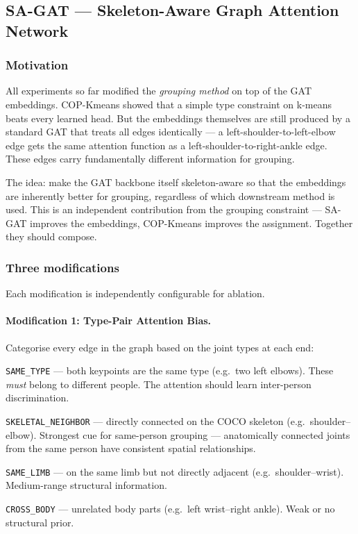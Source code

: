 \subsection{SA-GAT --- Skeleton-Aware Graph Attention Network}

\subsubsection{Motivation}

All experiments so far modified the \emph{grouping method} on top of the GAT embeddings. COP-Kmeans showed that a simple type constraint on k-means beats every learned head. But the embeddings themselves are still produced by a standard GAT that treats all edges identically --- a left-shoulder-to-left-elbow edge gets the same attention function as a left-shoulder-to-right-ankle edge. These edges carry fundamentally different information for grouping.

The idea: make the GAT backbone itself skeleton-aware so that the embeddings are inherently better for grouping, regardless of which downstream method is used. This is an independent contribution from the grouping constraint --- SA-GAT improves the embeddings, COP-Kmeans improves the assignment. Together they should compose.


\subsubsection{Three modifications}

Each modification is independently configurable for ablation.

\paragraph{Modification 1: Type-Pair Attention Bias.}

Categorise every edge in the graph based on the joint types at each end:

\begin{compactitem}
  \item \texttt{SAME\_TYPE} --- both keypoints are the same type (e.g.\ two left elbows). These \emph{must} belong to different people. The attention should learn inter-person discrimination.
  \item \texttt{SKELETAL\_NEIGHBOR} --- directly connected on the COCO skeleton (e.g.\ shoulder--elbow). Strongest cue for same-person grouping --- anatomically connected joints from the same person have consistent spatial relationships.
  \item \texttt{SAME\_LIMB} --- on the same limb but not directly adjacent (e.g.\ shoulder--wrist). Medium-range structural information.
  \item \texttt{CROSS\_BODY} --- unrelated body parts (e.g.\ left wrist--right ankle). Weak or no structural prior.
\end{compactitem}

